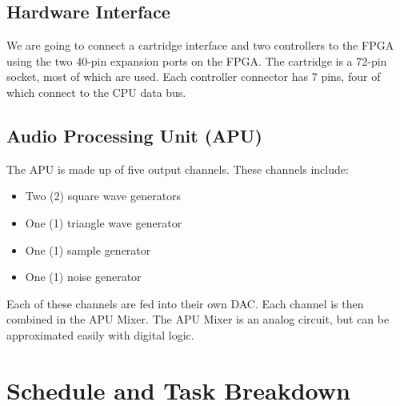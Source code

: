 \documentclass[a4paper]{article}
\begin{document}
\subsection{Hardware Interface}
We are going to connect a cartridge interface and two controllers to the FPGA using the two 40-pin expansion ports on the FPGA. The cartridge is a 72-pin socket, most of which are used. Each controller connector has 7 pins, four of which connect to the CPU data bus.

\subsection{Audio Processing Unit (APU)}
The APU is made up of five output channels. These channels include:
	\begin{itemize}
    	\item Two (2) square wave generators
        \item One (1) triangle wave generator
        \item One (1) sample generator
        \item One (1) noise generator
    \end{itemize}
    Each of these channels are fed into their own DAC. Each channel is then combined in the APU Mixer. The APU Mixer is an analog circuit, but can be approximated easily with digital logic.\cite{nesdev}


\section{Schedule and Task Breakdown}
\end{document}
